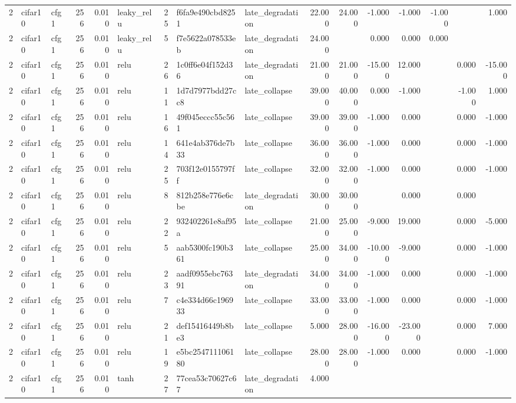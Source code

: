 \begin{table}[htbp]
{\begin{tabular}{@{}rllrrlrllrrrrrrr@{}}
2 & cifar10 & cfg1 & 256 & 0.010 & leaky\_relu & 25 & f6fa9e490cbd8251 & late\_degradation & 22.000 & 24.000 & -1.000 & -1.000 & -1.000 &  & 1.000 \\
2 & cifar10 & cfg1 & 256 & 0.010 & leaky\_relu & 5 & f7e5622a078533eb & late\_degradation & 24.000 &  & 0.000 & 0.000 & 0.000 &  &  \\
2 & cifar10 & cfg1 & 256 & 0.010 & relu & 26 & 1c0ff6e04f152d36 & late\_degradation & 21.000 & 21.000 & -15.000 & 12.000 &  & 0.000 & -15.000 \\
2 & cifar10 & cfg1 & 256 & 0.010 & relu & 11 & 1d7d7977bdd27cc8 & late\_collapse & 39.000 & 40.000 & 0.000 & -1.000 &  & -1.000 & 1.000 \\
2 & cifar10 & cfg1 & 256 & 0.010 & relu & 16 & 49f045eccc55c561 & late\_collapse & 39.000 & 39.000 & -1.000 & 0.000 &  & 0.000 & -1.000 \\
2 & cifar10 & cfg1 & 256 & 0.010 & relu & 14 & 641e4ab376de7b33 & late\_collapse & 36.000 & 36.000 & -1.000 & 0.000 &  & 0.000 & -1.000 \\
2 & cifar10 & cfg1 & 256 & 0.010 & relu & 25 & 703f12e0155797ff & late\_collapse & 32.000 & 32.000 & -1.000 & 0.000 &  & 0.000 & -1.000 \\
2 & cifar10 & cfg1 & 256 & 0.010 & relu & 8 & 812b258e776e6cbe & late\_degradation & 30.000 & 30.000 &  & 0.000 &  & 0.000 &  \\
2 & cifar10 & cfg1 & 256 & 0.010 & relu & 22 & 932402261e8af95a & late\_collapse & 21.000 & 25.000 & -9.000 & 19.000 &  & 0.000 & -5.000 \\
2 & cifar10 & cfg1 & 256 & 0.010 & relu & 5 & aab5300fc190b361 & late\_collapse & 25.000 & 34.000 & -10.000 & -9.000 &  & 0.000 & -1.000 \\
2 & cifar10 & cfg1 & 256 & 0.010 & relu & 23 & aadf0955ebc76391 & late\_degradation & 34.000 & 34.000 & -1.000 & 0.000 &  & 0.000 & -1.000 \\
2 & cifar10 & cfg1 & 256 & 0.010 & relu & 7 & c4e334d66c196933 & late\_collapse & 33.000 & 33.000 & -1.000 & 0.000 &  & 0.000 & -1.000 \\
2 & cifar10 & cfg1 & 256 & 0.010 & relu & 21 & def15416449b8be3 & late\_collapse & 5.000 & 28.000 & -16.000 & -23.000 &  & 0.000 & 7.000 \\
2 & cifar10 & cfg1 & 256 & 0.010 & relu & 19 & e5bc254711106180 & late\_collapse & 28.000 & 28.000 & -1.000 & 0.000 &  & 0.000 & -1.000 \\
2 & cifar10 & cfg1 & 256 & 0.010 & tanh & 27 & 77cea53c70627c67 & late\_degradation & 4.000 &  &  &  &  &  &  \\

\end{tabular}}
\end{table}
